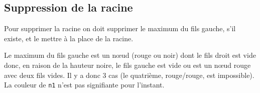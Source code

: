 \subsection{Suppression de la racine}
Pour supprimer la racine on doit supprimer le maximum du fils gauche, s'il existe, et le mettre à la place de la racine.

Le maximum du fils gauche est un nœud (rouge ou noir) dont le fils droit est vide donc, en raison de la hauteur noire, le fils gauche est vide ou est un nœud rouge avec deux fils vides. Il y a donc 3 cas (le quatrième, rouge/rouge, est impossible). La couleur de {\tt n1} n'est pas signifiante pour l'instant.


